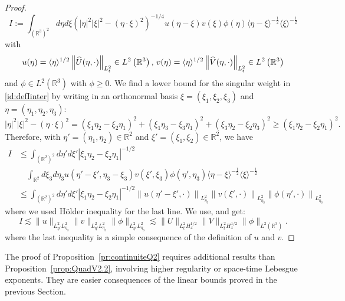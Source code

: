 \documentclass[AHL, Unicode, longabstracts,published]{cedram}
\newcommand{\R}{\mathbb{R}}
\let\oldhat\hat
\renewcommand*{\hat}[1]{\mathchoice{\widehat{#1}}{\widehat{#1}}{\oldhat{#1}}{\oldhat{#1}}}
\begin{document}
\begin{proof}
\begin{equation} \label{id:defIinter}
I := \int_{\left(\R^3\right)^2} d\eta d\xi \left(|\eta|^2|\xi|^2 - \left(\eta\cdot\xi\right)^2\right)^{-1/4} u(\eta-\xi) v(\xi) \phi(\eta) \langle \eta-\xi\rangle^{-\frac 12}\langle \xi \rangle^{-\frac 12}
\end{equation}
with
\[
u(\eta)=\langle \eta \rangle^{1/2}\left\|\hat U(\eta,\cdot)\right\|_{L^2_t}\in L^2\left(\R^3\right),\, v(\eta)=\langle \eta \rangle^{1/2} \left\|\hat V(\eta,\cdot)\right\|_{L^2_t}\in L^2\left(\R^3\right)
\]
and $\phi \in L^2(\R^3)$ with $\phi\geq0$. We find a lower bound for the singular weight in \eqref{id:defIinter} by writing in an orthonormal basis $\xi = (\xi_1,\xi_2,\xi_3)$ and $ \eta = (\eta_1,\eta_2,\eta_3)$:
\[
|\eta|^2|\xi|^2 - \left(\eta\cdot\xi\right)^2 = \left(\xi_1\eta_2 - \xi_2\eta_1\right)^2 + \left(\xi_1\eta_3 - \xi_3\eta_1\right)^2 +\left(\xi_3\eta_2 - \xi_2\eta_3\right)^2 \geq \left(\xi_1\eta_2 - \xi_2\eta_1\right)^2.
\]
Therefore, with $\eta' = (\eta_1,\eta_2)\in \R^2$ and $\xi' = (\xi_1,\xi_2)\in \R^2$, we have
\begin{align*}
I
&\leq \int_{(\R^2)^2} d\eta' d\xi' \left|\xi_1\eta_2 - \xi_2\eta_1\right|^{-1/2}\\
&\quad\int_{\R^2} d\xi_3d\eta_3 u\left(\eta'-\xi',\eta_3-\xi_3\right) v\left(\xi',\xi_3\right) \phi\left(\eta',\eta_3\right)
 \langle \eta-\xi\rangle^{-\frac 12} \langle \xi \rangle^{-\frac 12}\\
 &\leq \int_{\left(\R^2\right)^2} d\eta' d\xi' \left|\xi_1\eta_2 - \xi_2\eta_1\right|^{-1/2} \left\| u\left(\eta'-\xi',\cdot\right)\right\|_{L^2_{\eta_3}} \left\|v\left(\xi',\cdot\right)\right\|_{L^2_{\eta_3}}\left\| \phi\left(\eta',\cdot\right)\right\|_{L^2_{\eta_3}}
\end{align*}
where we used H\"older inequality for the last line. We use,\cite[Lemma~5]{lewsab2} and get:
\[
I \lesssim \|u\|_{L^2_{\eta'}L^2_{\eta_3}}\|v\|_{L^2_{\eta'}L^2_{\eta_3}}\| \phi \|_{L^2_{\eta'}L^2_{\eta_3}}\lesssim \| U \|_{L^2_{t}H^{1/2}_x}\| V\|_{L^2_{t}H^{1/2}_x}\| \phi \|_{L^2\left(\R^3\right)}.
\]
where the last inequality is a simple consequence of the definition of $u$ and $v$.
\end{proof}


The proof of Proposition~\ref{pr:continuiteQ2} requires additional results than Proposition~\ref{prop:QuadV2.2}, involving higher regularity or space-time Lebesgue exponents. They are easier consequences of the linear bounds proved in the previous Section.
\end{document}
